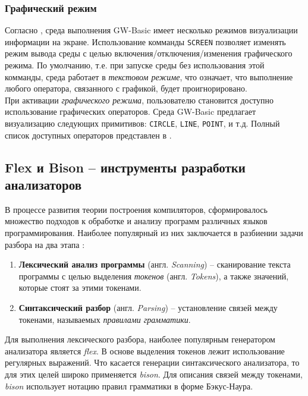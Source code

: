 \documentclass[12pt]{article}
\begin{document}
			\subsubsection{Графический режим}
			\label{subsec:graphixMode}
			\hspace{\parindent} Согласно \cite[стр.~142]{basicManual}, среда выполнения GW-Basic имеет несколько режимов визуализации информации на экране. Использование комманды {\tt SCREEN} позволяет изменять режим вывода среды с целью включения/отключения/изменения графического режима. По умолчанию, т.е. при запуске среды без использования этой комманды, среда работает в {\it текстовом режиме}, что означает, что выполнение любого оператора, связанного с графикой, будет проигнорировано. \\
			\indent При активации {\it графического режима}, пользователю становится доступно использование графических операторов. Среда GW-Basic предлагает визуализацию следующих примитивов: {\tt CIRCLE}, {\tt LINE}, {\tt POINT}, и т.д. Полный список доступных операторов представлен в \cite[стр.~117]{basicManual}. 

		\subsection{Flex и Bison -- инструменты разработки анализаторов}
		\hspace{\parindent} В процессе развития теории построения компиляторов, сформировалось множество подходов к обработке и анализу программ различных языков программирования. Наиболее популярный из них заключается в разбиении задачи разбора на два этапа \cite[стр.~21]{flexManual}:
		\begin{enumerate}
			\item {\bf Лексический анализ программы} (англ. {\it Scanning}) -- сканирование текста программы с целью выделения {\it токенов} (англ. {\it Tokens}), а также значений, которые стоят за этими токенами.
			\item {\bf Синтаксический разбор} (англ. {\it Parsing}) -- установление связей между токенами, называемых {\it правилами грамматики}. 
		\end{enumerate}
		
		\indent Для выполнения лексического разбора, наиболее популярным генератором анализатора является {\it flex}. В основе выделения токенов лежит использование регулярных выражений. Что касается генерации синтаксического анализатора, то для этих целей широко применяется {\it bison}. Для описания связей между токенами, {\it bison} использует нотацию правил грамматики в форме Бэкус-Наура.	
\end{document}
